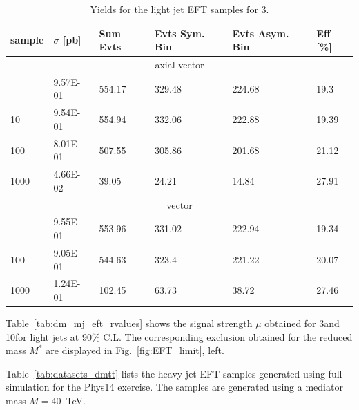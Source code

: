 \begin{table}[h!]
\centering
\begin{tabular}{llllll}
\hline
sample             & $\sigma$ [pb] & Sum Evts       & Evts Sym. Bin & Evts Asym. Bin & Eff  [\%]   \\\hline
\multicolumn{6}{c}{axial-vector}        \\\line
1    & 9.57E-01 & 554.17 & 329.48 & 224.68 & 19.3  \\
10   & 9.54E-01 & 554.94 & 332.06 & 222.88 & 19.39 \\
100  & 8.01E-01 & 507.55 & 305.86 & 201.68 & 21.12 \\
1000 & 4.66E-02 & 39.05  & 24.21  & 14.84  & 27.91 \\
\multicolumn{6}{c}{vector}        \\\line
110    & 9.55E-01 & 553.96 & 331.02 & 222.94 & 19.34 \\
100   & 9.05E-01 & 544.63 & 323.4  & 221.22 & 20.07 \\
1000  & 1.24E-01 & 102.45 & 63.73  & 38.72  & 27.46 \\
\hline
\end{tabular}
\caption{Yields for the light jet EFT samples for 3\fbinv.} 
\label{tab:dm_mj_eft_yields}
\end{table}



Table~\ref{tab:dm_mj_eft_rvalues} shows the signal strength $\mu$ obtained for 3\fbinv and 10\fbinv for light jets at 90\% C.L. The corresponding exclusion obtained for the reduced mass $M^*$ are displayed in Fig.~\ref{fig:EFT_limit}, left.



Table~\ref{tab:datasets_dmtt} lists the heavy jet EFT samples generated using full simulation for the Phys14 exercise. The samples are generated using a mediator mass $M=40$~TeV.

